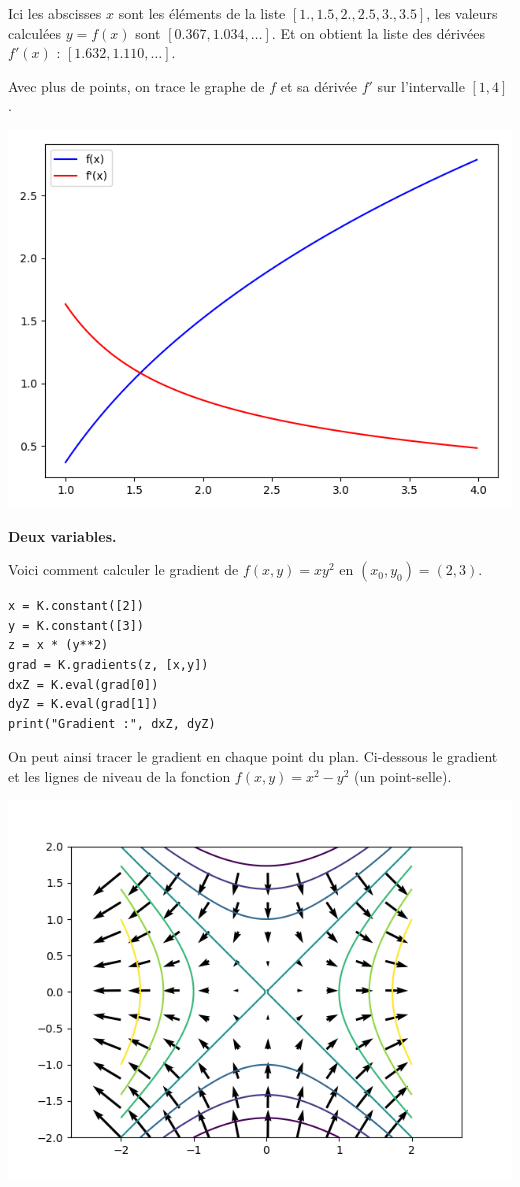 \documentclass[11pt,class=report,crop=false]{standalone}
\begin{document}
Ici les abscisses $x$ sont les éléments de la liste $[1., 1.5, 2., 2.5, 3., 3.5]$,
les valeurs calculées $y=f(x)$ sont $[0.367, 1.034, \ldots ]$.
Et on obtient la liste des dérivées $f'(x)$ : $[1.632,  1.110, \ldots]$.


Avec plus de points, on trace le graphe de $f$ et sa dérivée $f'$ sur l'intervalle $[1,4]$.
\begin{center}
\includegraphics[scale=\myscale,scale=0.6]{figures/tenseur-derivee}
\end{center}


\textbf{Deux variables.}

Voici comment calculer le gradient de $f(x,y) = xy^2$ en $(x_0,y_0)= (2,3)$.

\begin{lstlisting}
x = K.constant([2])
y = K.constant([3])
z = x * (y**2) 
grad = K.gradients(z, [x,y])
dxZ = K.eval(grad[0])
dyZ = K.eval(grad[1])
print("Gradient :", dxZ, dyZ)
\end{lstlisting}


On peut ainsi tracer le gradient en chaque point du plan. Ci-dessous le gradient et les lignes de niveau de la fonction $f(x,y) = x^2-y^2$ (un point-selle).
\begin{center}
\includegraphics[scale=\myscale,scale=0.8]{figures/tenseur-gradient}
\end{center}
\end{document}
